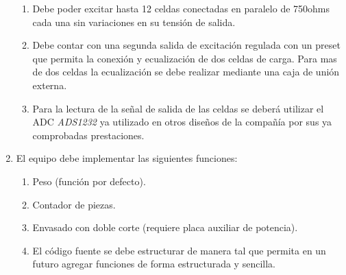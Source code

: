 \documentclass[11pt]{charter}
\begin{document}
\begin{enumerate}
\begin{enumerate}
	\item Debe poder excitar hasta 12 celdas conectadas en paralelo de 750ohms cada una sin variaciones en su tensión de salida. 
	\item Debe contar con una segunda salida de excitación regulada con un preset que permita la conexión y ecualización de dos celdas de carga. Para mas de dos celdas la ecualización se debe realizar mediante una caja de unión externa.
	\item Para la lectura de la señal de salida de las celdas se deberá utilizar el ADC \textit{ADS1232} ya utilizado en otros diseños de la compañía por sus ya comprobadas prestaciones.
	\end{enumerate}	
\item El equipo debe implementar las siguientes funciones:
	\begin{enumerate}
	\item Peso (función por defecto).
	\item Contador de piezas.
	\item Envasado con doble corte (requiere placa auxiliar de potencia).
	\item El código fuente se debe estructurar de manera tal que permita en un futuro agregar funciones de forma estructurada y sencilla.
	\end{enumerate}				
\end{enumerate}
\end{document}
